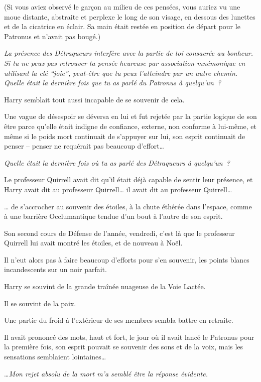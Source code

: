 (Si vous aviez observé le garçon au milieu de ces pensées, vous auriez vu une moue distante, abstraite et perplexe le long de son visage, en dessous des lunettes et de la cicatrice en éclair. Sa main était restée en position de départ pour le Patronus et n'avait pas bougé.)

\emph{La présence des Détraqueurs interfère avec la partie de toi consacrée au bonheur. Si tu ne peux pas retrouver ta pensée heureuse par association mnémonique en utilisant la clé “joie”, peut-être que tu peux l'atteindre par un autre chemin. Quelle était la dernière fois que tu as parlé du Patronus à quelqu'un~?}

Harry semblait tout aussi incapable de se souvenir de cela.

Une vague de désespoir se déversa en lui et fut rejetée par la partie logique de son être parce qu'elle était indigne de confiance, externe, non conforme à lui-même, et même si le poids mort continuait de s'appuyer sur lui, son esprit continuait de penser -- penser ne requérait pas beaucoup d'effort…

\emph{Quelle était la dernière fois où tu as parlé des Détraqueurs à quelqu'un~?}

Le professeur Quirrell avait dit qu'il était déjà capable de sentir leur présence, et Harry avait dit au professeur Quirrell… il avait dit au professeur Quirrell…

… de s'accrocher au souvenir des étoiles, à la chute éthérée dans l'espace, comme à une barrière Occlumantique tendue d'un bout à l'autre de son esprit.

Son second cours de Défense de l'année, vendredi, c'est là que le professeur Quirrell lui avait montré les étoiles, et de nouveau à Noël.

Il n'eut alors pas à faire beaucoup d'efforts pour s'en souvenir, les points blancs incandescents sur un noir parfait.

Harry se souvint de la grande traînée nuageuse de la Voie Lactée.

Il se souvint de la paix.

Une partie du froid à l'extérieur de ses membres sembla battre en retraite.

Il avait prononcé des mots, haut et fort, le jour où il avait lancé le Patronus pour la première fois, son esprit pouvait se souvenir des sons et de la voix, mais les sensations semblaient lointaines…

…\emph{Mon rejet absolu de la mort m'a semblé être la réponse évidente.}

